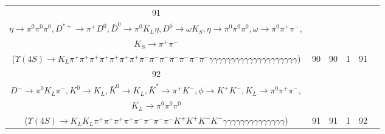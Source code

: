 \documentclass[landscape]{article}
\begin{document}
\begin{table}[htbp!]
\begin{tabular}{|c|c|c|c|c|c|}
\hline
91 & \makecell{ $ 
\Upsilon(4S) \rightarrow B^{0} \bar{B}^{0} ,
B^{0} \rightarrow \pi^{0} \pi^{+} \pi^{+} \pi^{-} \bar{D}^{*-} ,
\bar{B}^{0} \rightarrow \rho^{0} \pi^{+} \pi^{-} \rho^{-} \eta D^{*+} ,
\bar{D}^{*-} \rightarrow \pi^{-} \bar{D}^{0} ,
\rho^{0} \rightarrow \pi^{+} \pi^{-} ,
\rho^{-} \rightarrow \pi^{0} \pi^{-} ,
$ \\ $
\eta \rightarrow \pi^{0} \pi^{0} \pi^{0} ,
D^{*+} \rightarrow \pi^{+} D^{0} ,
\bar{D}^{0} \rightarrow \pi^{0} K_{L} \eta ,
D^{0} \rightarrow \omega K_{S} ,
\eta \rightarrow \pi^{0} \pi^{0} \pi^{0} ,
\omega \rightarrow \pi^{0} \pi^{+} \pi^{-} ,
$ \\ $
K_{S} \rightarrow \pi^{+} \pi^{-} 
$ \\ ($
\Upsilon(4S) \rightarrow K_{L} \pi^{+} \pi^{+} \pi^{+} \pi^{+} \pi^{+} \pi^{+} \pi^{+} \pi^{-} \pi^{-} \pi^{-} \pi^{-} \pi^{-} \pi^{-} \pi^{-} \gamma \gamma \gamma \gamma \gamma \gamma \gamma \gamma \gamma \gamma \gamma \gamma \gamma \gamma \gamma \gamma \gamma \gamma \gamma \gamma 
$) } & 90 & 90 & 1 & 91 \\
\hline
92 & \makecell{ $ 
\Upsilon(4S) \rightarrow B^{0} \bar{B}^{0} ,
B^{0} \rightarrow \pi^{0} \rho^{0} \pi^{+} \rho^{-} \bar{K}^{0} K^{+} D^{-} ,
\bar{B}^{0} \rightarrow K^{0} \bar{K}^{0} \bar{K}^{*} \phi ,
\rho^{0} \rightarrow \pi^{+} \pi^{-} ,
\rho^{-} \rightarrow \pi^{0} \pi^{-} ,
\bar{K}^{0} \rightarrow K_{L} ,
$ \\ $
D^{-} \rightarrow \pi^{0} K_{L} \pi^{-} ,
K^{0} \rightarrow K_{L} ,
\bar{K}^{0} \rightarrow K_{L} ,
\bar{K}^{*} \rightarrow \pi^{+} K^{-} ,
\phi \rightarrow K^{+} K^{-} ,
K_{L} \rightarrow \pi^{0} \pi^{+} \pi^{-} ,
$ \\ $
K_{L} \rightarrow \pi^{0} \pi^{0} \pi^{0} 
$ \\ ($
\Upsilon(4S) \rightarrow K_{L} K_{L} \pi^{+} \pi^{+} \pi^{+} \pi^{+} \pi^{-} \pi^{-} \pi^{-} \pi^{-} K^{+} K^{+} K^{-} K^{-} \gamma \gamma \gamma \gamma \gamma \gamma \gamma \gamma \gamma \gamma \gamma \gamma \gamma \gamma 
$) } & 91 & 91 & 1 & 92 \\
\hline
\end{tabular}
\end{table}

\clearpage
\end{document}
